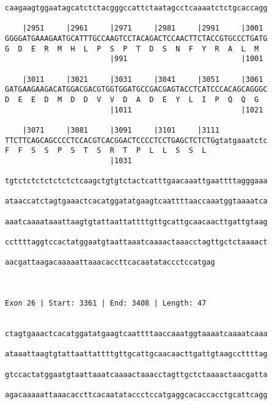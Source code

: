 \documentclass{article}
\begin{document}
\begin{Verbatim}
caagaagtggaatagcatctctacgggccattctaatagcctcaaaatctctgcaccagg
                                                            
    |2951     |2961     |2971     |2981     |2991     |3001 
GGGGATGAAAGAATGCATTTGCCAAGTCCTACAGACTCCAACTTCTACCGTGCCCTGATG
G  D  E  R  M  H  L  P  S  P  T  D  S  N  F  Y  R  A  L  M  
                        |991                          |1001 
  
    |3011     |3021     |3031     |3041     |3051     |3061 
GATGAAGAAGACATGGACGACGTGGTGGATGCCGACGAGTACCTCATCCCACAGCAGGGC
D  E  E  D  M  D  D  V  V  D  A  D  E  Y  L  I  P  Q  Q  G  
                        |1011                         |1021 
  
    |3071     |3081     |3091     |3101     |3111           
TTCTTCAGCAGCCCCTCCACGTCACGGACTCCCCTCCTGAGCTCTCTGgtatgaaatctc
F  F  S  S  P  S  T  S  R  T  P  L  L  S  S  L              
                        |1031                               
  
tgtctctctctctctctcaagctgtgtctactcatttgaacaaattgaattttagggaaa
                                                            
ataaccatctagtgaaactcacatggatatgaagtcaattttaaccaaatggtaaaatca
                                                            
aaatcaaaataaattaagtgtattaattattttgttgcattgcaacaacttgattgtaag
                                                            
ccttttaggtccactatggaatgtaattaaatcaaaactaaacctagttgctctaaaact
                                                            
aacgattaagacaaaaattaaacaccttcacaatataccctccatgag
                                                
                                                
 
Exon 26 | Start: 3361 | End: 3408 | Length: 47


ctagtgaaactcacatggatatgaagtcaattttaaccaaatggtaaaatcaaaatcaaa
                                                            
ataaattaagtgtattaattattttgttgcattgcaacaacttgattgtaagccttttag
                                                            
gtccactatggaatgtaattaaatcaaaactaaacctagttgctctaaaactaacgatta
                                                            
agacaaaaattaaacaccttcacaatataccctccatgaggcacaccacctgcattcagg
                                                            

\end{Verbatim}
\end{document}
